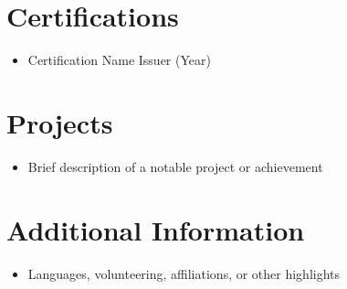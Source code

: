\documentclass[11pt,a4paper]{article}
\begin{document}
\section*{Certifications}
\begin{itemize}[leftmargin=1.5em]
    \item Certification Name \textemdash{} Issuer (Year)
\end{itemize}

\section*{Projects}
\begin{itemize}[leftmargin=1.5em]
    \item Brief description of a notable project or achievement
\end{itemize}

\section*{Additional Information}
\begin{itemize}[leftmargin=1.5em]
    \item Languages, volunteering, affiliations, or other highlights
\end{itemize}
\end{document}
